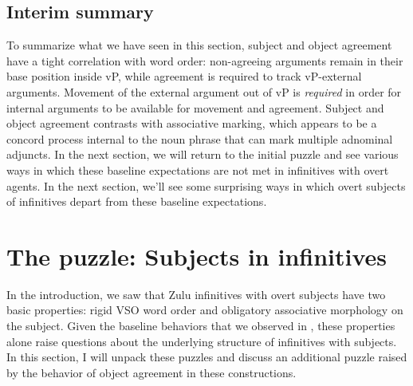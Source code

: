 \documentclass[output=paper,colorlinks,citecolor=brown]{langscibook}
\begin{document}



%         



\subsection{Interim summary}\label{sec:halpert:2.4}

To summarize what we have seen in this section, subject and object agreement have a tight correlation with word order: non-agreeing arguments remain in their base position inside vP, while agreement is required to track vP-external arguments. Movement of the external argument out of vP is \textit{required} in order for internal arguments to be available for movement and agreement. Subject and object agreement contrasts with associative marking, which appears to be a concord process internal to the noun phrase that can mark multiple adnominal adjuncts. In the next section, we will return to the initial puzzle and see various ways in which these baseline expectations are not met in infinitives with overt agents. In the next section, we'll see some surprising ways in which overt subjects of infinitives depart from these baseline expectations.

\section{The puzzle: Subjects in infinitives}\label{sec:halpert:3}

In the introduction, we saw that Zulu infinitives with overt subjects have two basic properties: rigid VSO word order and obligatory associative morphology on the subject.  Given the baseline behaviors that we observed in , these properties alone raise questions about the underlying structure of infinitives with subjects.  In this section, I will unpack these puzzles and discuss an additional puzzle raised by the behavior of object agreement in these constructions.
\end{document}
